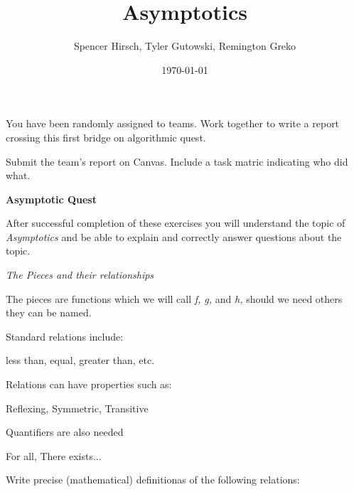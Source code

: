 \documentclass{article}
\begin{document}
\title{Asymptotics}
\author{Spencer Hirsch, Tyler Gutowski, Remington Greko}
\date{\today}
\maketitle

\noindent You have been randomly assigned to teams. Work together to write a report
crossing this first bridge on algorithmic quest.

\medskip

\noindent Submit the team's report on Canvas. Include a task matric indicating who 
did what.

\begin{table}

\end{table}

\bigskip

\noindent \textbf{Asymptotic Quest}

\medskip

After successful completion of these exercises you will understand the topic of
\textit{Asymptotics} and be able to explain and correctly answer questions about
the topic.

\bigskip

\noindent  \textit{The Pieces and their relationships}

\medskip

The pieces are functions which we will call \textit{f, g,} and \textit{h,} should
we need others they can be named.

\medskip

\noindent Standard relations include:

\medskip

\begin{center}
    less than, equal, greater than, etc.
\end{center}

\noindent Relations can have properties such as:

\begin{center}
Reflexing, Symmetric, Transitive
\end{center}

\noindent Quantifiers are also needed

\begin{center}
For all, There exists...
\end{center}

\noindent Write precise (mathematical) definitionas of the following relations:
\end{document}
